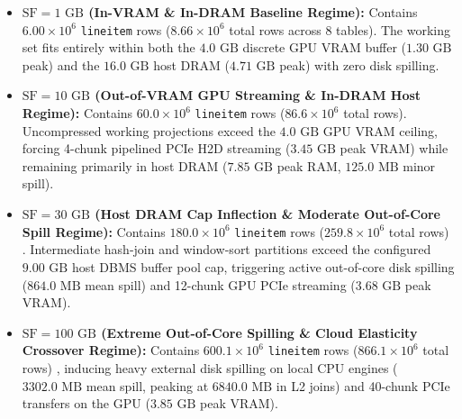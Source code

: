 \documentclass[10pt,a4paper]{article}
\begin{document}
\begin{itemize}[leftmargin=1.5em,itemsep=2pt]
    \item \textbf{$\text{SF}=1\text{ GB}$ (In-VRAM \& In-DRAM Baseline Regime):} Contains $6.00\times 10^6$ \texttt{lineitem} rows ($8.66\times 10^6$ total rows across 8 tables). The working set fits entirely within both the $4.0\text{ GB}$ discrete GPU VRAM buffer ($1.30\text{ GB}$ peak) and the $16.0\text{ GB}$ host DRAM ($4.71\text{ GB}$ peak) with zero disk spilling.
    \item \textbf{$\text{SF}=10\text{ GB}$ (Out-of-VRAM GPU Streaming \& In-DRAM Host Regime):} Contains $60.0\times 10^6$ \texttt{lineitem} rows ($86.6\times 10^6$ total rows). Uncompressed working projections exceed the $4.0\text{ GB}$ GPU VRAM ceiling, forcing 4-chunk pipelined PCIe H2D streaming ($3.45\text{ GB}$ peak VRAM) while remaining primarily in host DRAM ($7.85\text{ GB}$ peak RAM, $125.0\text{ MB}$ minor spill).
    \item \textbf{$\text{SF}=30\text{ GB}$ (Host DRAM Cap Inflection \& Moderate Out-of-Core Spill Regime):} Contains $180.0\times 10^6$ \texttt{lineitem} rows ($259.8\times 10^6$ total rows) \cite{tpc2022tpch}. Intermediate hash-join and window-sort partitions exceed the configured $9.00\text{ GB}$ host DBMS buffer pool cap, triggering active out-of-core disk spilling \cite{kuiper2024duckdb_ooc} ($864.0\text{ MB}$ mean spill) and 12-chunk GPU PCIe streaming ($3.68\text{ GB}$ peak VRAM).
    \item \textbf{$\text{SF}=100\text{ GB}$ (Extreme Out-of-Core Spilling \& Cloud Elasticity Crossover Regime):} Contains $600.1\times 10^6$ \texttt{lineitem} rows ($866.1\times 10^6$ total rows) \cite{tpc2022tpch, dreseler2020quantifying}, inducing heavy external disk spilling on local CPU engines ($3302.0\text{ MB}$ mean spill, peaking at $6840.0\text{ MB}$ in L2 joins) and 40-chunk PCIe transfers on the GPU ($3.85\text{ GB}$ peak VRAM).
\end{itemize}
\end{document}
